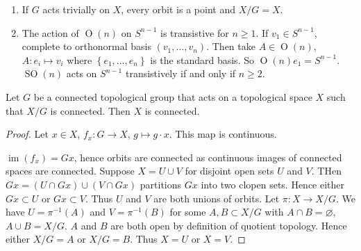 \begin{examples}
	\begin{enumerate}
		\item If $G$ acts trivially on $X$, every orbit is a point
		and $X/G = X$.

		\item The action of $\operatorname{O}(n)$ on $S^{n-1}$
		is transistive for $n \geq 1$.
		If $v_1 \in S^{n-1}$, complete to orthonormal basis
		$(v_1, \ldots, v_n)$.
		Then take $A \in \operatorname{O}(n)$,
		$A: e_i \mapsto v_i$ where
		$\left\{ e_1, \ldots, e_n \right\}$ is the standard basis.
		So $\operatorname{O}(n) e_1 = S^{n-1}$.
		$\operatorname{SO}(n)$ acts on $S^{n-1}$ transistively
		if and only if $n \geq 2$.
	\end{enumerate}
\end{examples}

\begin{theorem}
	Let $G$ be a connected topological group that acts on a topological space
	$X$ such that $X/G$ is connected.
	Then $X$ is connected.
\end{theorem}

\begin{proof}
	Let $x \in X$, $f_x: G \to X$, $g \mapsto g \cdot x$.
	This map is continuous.
	\begin{center}
	\end{center}
	$\operatorname{im}(f_x) = Gx$, hence orbits are connected as continuous
	images of connected spaces are connected. 
	Suppose $X = U \cup V$ for disjoint open sets $U$ and $V$.
	THen $Gx = (U \cap Gx) \cup (V \cap Gx)$ partitions $Gx$ into two
	clopen sets.
	Hence either $Gx \subset U$ or $Gx \subset V$.
	Thus $U$ and $V$ are both unions of orbits.
	Let $\pi: X \to X/G$.
	We have $U = \pi^{-1}(A)$ and 
	$V = \pi^{-1}(B)$ for some $A, B \subset X/G$ with 
	$A \cap B = \varnothing$, $A \cup B = X/G$.
	$A$ and $B$ are both open by definition of quotient topology.
	Hence either $X/G = A$ or $X/G = B$.
	Thus $X = U$ or $X = V$.
\end{proof}